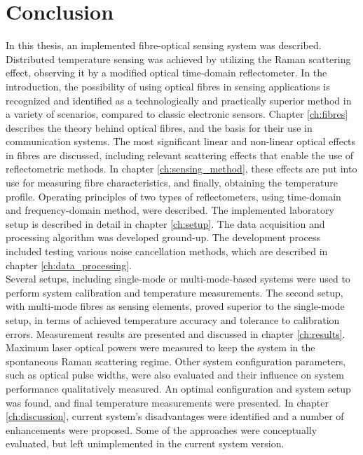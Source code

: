 \documentclass{standalone}
\begin{document}
\chapter{Conclusion}
\setcounter{page}\thestranica


In this thesis, an implemented fibre-optical sensing system was described. Distributed temperature sensing was achieved by utilizing the Raman scattering effect, observing it by a modified optical time-domain reflectometer. In the introduction, the possibility of using optical fibres in sensing applications is recognized and identified as a technologically and practically superior method in a variety of scenarios, compared to classic electronic sensors. Chapter \ref{ch:fibres} describes the theory behind optical fibres, and the basis for their use in communication systems. The most significant linear and non-linear optical effects in fibres are discussed, including relevant scattering effects that enable the use of reflectometric methods. In chapter \ref{ch:sensing_method}, these effects are put into use for measuring fibre characteristics, and finally, obtaining the temperature profile. Operating principles of two types of reflectometers, using time-domain and frequency-domain method, were described. The implemented laboratory setup is described in detail in chapter \ref{ch:setup}. The data acquisition and processing algorithm was developed ground-up. The development process included testing various noise cancellation methods, which are described in chapter \ref{ch:data_processing}. \\

Several setups, including single-mode or multi-mode-based systems were used to perform system calibration and temperature measurements. The second setup, with multi-mode fibres as sensing elements, proved superior to the single-mode setup, in terms of achieved temperature accuracy and tolerance to calibration errors. Measurement results are presented and discussed in chapter \ref{ch:results}. Maximum laser optical powers were measured to keep the system in the spontaneous Raman scattering regime. Other system configuration parameters, such as optical pulse widths, were also evaluated and their influence on system performance qualitatively measured. An optimal configuration and system setup was found, and final temperature measurements were presented. In chapter \ref{ch:discussion}, current system's disadvantages were identified and a number of enhancements were proposed. Some of the approaches were conceptually evaluated, but left unimplemented in the current system version. \\
\end{document}
